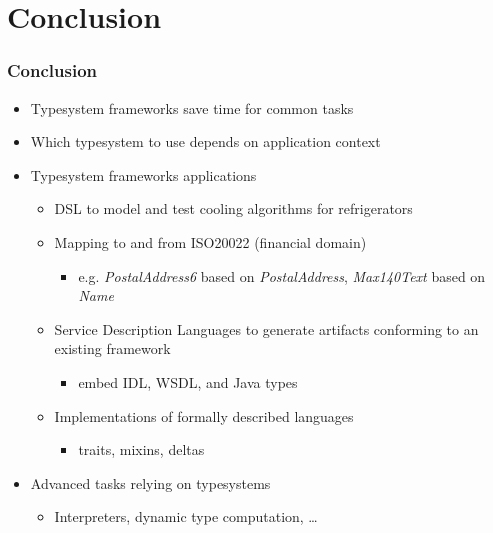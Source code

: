 \section{Conclusion}

\begin{frame}
  \frametitle{Conclusion}
  
  \begin{itemize}
    \item Typesystem frameworks save time for common tasks
    \item Which typesystem to use depends on application context
    \item Typesystem frameworks applications
    \begin{itemize}
      \item DSL to model and test cooling algorithms for refrigerators 
      \item Mapping to and from ISO20022 (financial domain)
      \begin{itemize}
        \item e.g. \emph{PostalAddress6} based on \emph{PostalAddress},
        \emph{Max140Text} based on \emph{Name}
      \end{itemize}
      \item Service Description Languages to generate artifacts conforming
      to an existing framework
      \begin{itemize}
        \item embed IDL, WSDL, and Java types
      \end{itemize}
      \item Implementations of formally described languages
       \begin{itemize}
        \item traits, mixins, deltas
      \end{itemize}
    \end{itemize}
    \item Advanced tasks relying on typesystems
    \begin{itemize}
      \item Interpreters, dynamic type computation, \ldots
    \end{itemize}
  \end{itemize}
\end{frame}

